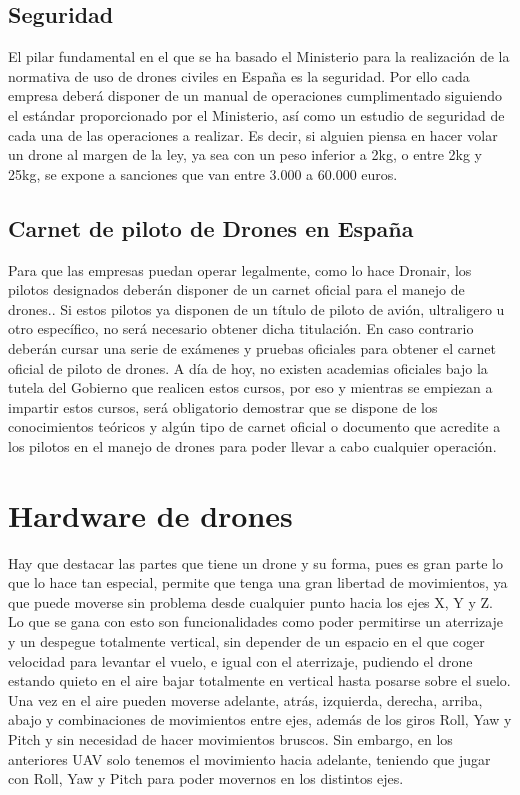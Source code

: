 \subsection{Seguridad}
El pilar fundamental en el que se ha basado el Ministerio para la realización de la normativa de uso de drones civiles en España es la seguridad. Por ello cada empresa deberá disponer de un manual de operaciones cumplimentado siguiendo el estándar proporcionado por el Ministerio, así como un estudio de seguridad de cada una de las operaciones a realizar. Es decir, si alguien piensa en hacer volar un drone al margen de la ley, ya sea con un peso inferior a 2kg, o entre 2kg y 25kg, se expone a sanciones que van entre 3.000 a 60.000 euros.

\subsection{Carnet de piloto de Drones en España}
Para que las empresas puedan operar legalmente, como lo hace Dronair, los pilotos designados deberán disponer de un carnet oficial para el manejo de drones.. Si estos pilotos ya disponen de un título de piloto de avión, ultraligero u otro específico, no será necesario obtener dicha titulación. En caso contrario deberán cursar una serie de exámenes y pruebas oficiales para obtener el carnet oficial de piloto de drones. A día de hoy, no existen academias oficiales bajo la tutela del Gobierno que realicen estos cursos, por eso y mientras se empiezan a impartir estos cursos, será obligatorio demostrar que se dispone de los conocimientos teóricos y algún tipo de carnet oficial o documento que acredite a los pilotos en el manejo de drones para poder llevar a cabo cualquier operación.

\section{Hardware de drones}

Hay que destacar las partes que tiene un drone y su forma, pues es gran parte
lo que lo hace tan especial, permite que tenga una gran libertad de movimientos, ya
que puede moverse sin problema desde cualquier punto hacia los ejes X, Y y Z. Lo
que se gana con esto son funcionalidades como poder permitirse un aterrizaje y un
despegue totalmente vertical, sin depender de un espacio en el que coger velocidad
para levantar el vuelo, e igual con el aterrizaje, pudiendo el drone estando quieto en
el aire bajar totalmente en vertical hasta posarse sobre el suelo. Una vez en el aire
pueden moverse adelante, atrás, izquierda, derecha, arriba, abajo y combinaciones de
movimientos entre ejes, además de los giros Roll, Yaw y Pitch y sin necesidad de hacer
movimientos bruscos. Sin embargo, en los anteriores UAV solo tenemos el movimiento
hacia adelante, teniendo que jugar con Roll, Yaw y Pitch para poder movernos en los
distintos ejes.

